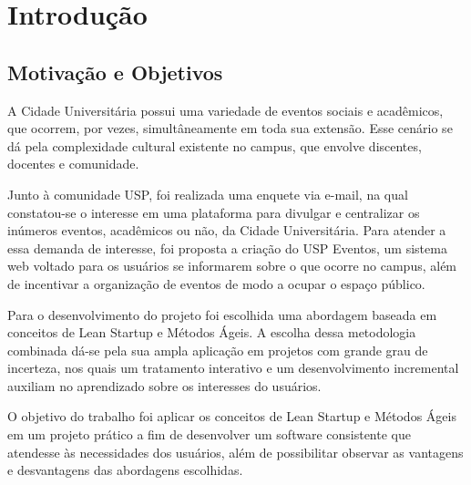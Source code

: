 \chapter{Introdução}
\label{cap:introducao}
\section{Motivação e Objetivos}

\par A Cidade Universitária possui uma variedade de eventos sociais e acadêmicos, que ocorrem, por vezes, simultâneamente em toda sua extensão. Esse cenário se dá pela complexidade cultural existente no campus, que envolve discentes, docentes e comunidade.

\par Junto à comunidade USP, foi realizada uma enquete via e-mail, na qual constatou-se o interesse em uma plataforma para divulgar e centralizar os inúmeros eventos, acadêmicos ou não, da Cidade Universitária. Para atender a essa demanda de interesse, foi proposta a criação do USP Eventos, um sistema web voltado para os usuários se informarem sobre o que ocorre no campus, além de incentivar a organização de eventos de modo a ocupar o espaço público.

\par Para o desenvolvimento do projeto foi escolhida uma abordagem baseada em conceitos de Lean Startup e Métodos Ágeis. A escolha dessa metodologia combinada dá-se pela sua ampla aplicação em projetos com grande grau de incerteza, nos quais um tratamento interativo e um desenvolvimento incremental auxiliam no aprendizado sobre os interesses do usuários.

\par O objetivo do trabalho foi aplicar os conceitos de Lean Startup e Métodos Ágeis em um projeto prático a fim de desenvolver um software consistente que atendesse às necessidades dos usuários, além de possibilitar observar as vantagens e desvantagens das abordagens escolhidas.
